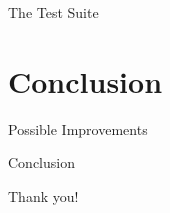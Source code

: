 \documentclass[smaller,dvipsnames,ratio=169]{beamer}
\begin{document}
  \begin{frame}{The Test Suite}

  \end{frame}

  \section{Conclusion}

  \begin{frame}{Possible Improvements}
  \end{frame}

  \begin{frame}{Conclusion}
  \end{frame}

  \begin{frame}[standout]
    Thank you!
  \end{frame}
\end{document}
